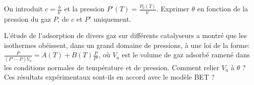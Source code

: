 \question On introduit $c=\frac{b}{b'}$ et la pression $P'(T)=\frac{P_0(T)}{b'}$.  Exprimer $\theta$ en fonction de la pression du gaz $P$, de $c$ et $P'$ uniquement.


\question L'étude de l'adsorption de divers gaz  sur différents catalyseurs a montré que les isothermes obéissent, dans un grand domaine de pressions, à une loi de la forme:
$\frac{P}{(P'-P)V_a}=A(T)+B(T) \frac{P}{P'}$, où $V_a$ est le volume de gaz adsorbé ramené dans  les conditions normales de température et de pression. Comment relier $V_a$ à $\theta$ ? Ces résultats expérimentaux sont-ils en accord avec le modèle BET ?
